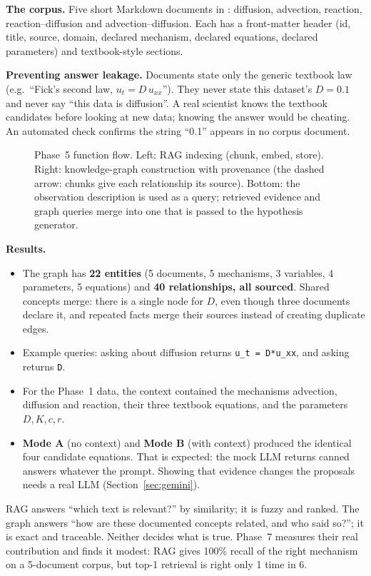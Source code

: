 \textbf{The corpus.} Five short Markdown documents in : diffusion, advection, reaction,
reaction--diffusion and advection--diffusion. Each has a front-matter header (id, title, source, domain,
declared mechanism, declared equations, declared parameters) and textbook-style sections.

\textbf{Preventing answer leakage.} Documents state only the generic textbook law (e.g.\ ``Fick's second law,
$u_t=D\,u_{xx}$''). They never state this dataset's $D=0.1$ and never say ``this data is diffusion''. A real
scientist knows the textbook candidates before looking at new data; knowing the answer would be cheating. An
automated check confirms the string ``0.1'' appears in no corpus document.

\begin{figure}[!htb]
\centering

\pkglegend
\caption{Phase~5 function flow. Left: RAG indexing (chunk, embed, store). Right: knowledge-graph construction
with provenance (the dashed arrow: chunks give each relationship its source). Bottom: the observation
description is used as a query; retrieved evidence and graph queries merge into one  that
is passed to the hypothesis generator.}
\label{fig:p5}
\end{figure}

\textbf{Results.}
\begin{itemize}
  \item The graph has \textbf{22 entities} (5 documents, 5 mechanisms, 3 variables, 4 parameters, 5 equations)
        and \textbf{40 relationships, all sourced}. Shared concepts merge: there is a single node for $D$,
        even though three documents declare it, and repeated facts merge their sources instead of creating
        duplicate edges.
  \item Example queries: asking  about diffusion returns \texttt{u\_t = D*u\_xx},
        and asking  returns \texttt{D}.
  \item For the Phase~1 data, the context contained the mechanisms advection, diffusion and reaction, their
        three textbook equations, and the parameters $D, K, c, r$.
  \item \textbf{Mode A} (no context) and \textbf{Mode B} (with context) produced the identical four candidate equations. That is
        expected: the mock LLM returns canned answers whatever the prompt. Showing that evidence changes the
        proposals needs a real LLM (Section~\ref{sec:gemini}).
\end{itemize}

\begin{lesson}
RAG answers ``which text is relevant?'' by similarity; it is fuzzy and ranked. The graph answers ``how are these
documented concepts related, and who said so?''; it is exact and traceable. Neither decides what is true.
Phase~7 measures their real contribution and finds it modest: RAG gives 100\% recall of the right mechanism on a
5-document corpus, but top-1 retrieval is right only 1 time in 6.
\end{lesson}
